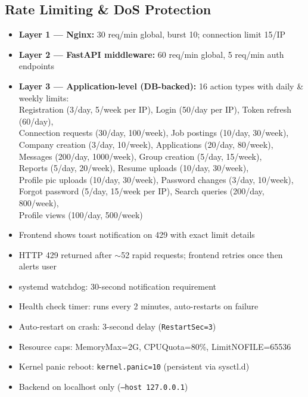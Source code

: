 \documentclass[11pt,a4paper]{article}
\begin{document}
\subsection{Rate Limiting \& DoS Protection}

\begin{tcolorbox}[colback=pass!5, colframe=pass, title=\textbf{Rate Limiting --- PASS}]
\begin{itemize}[nosep]
  \item \textbf{Layer 1 --- Nginx:} 30 req/min global, burst 10; connection limit 15/IP
  \item \textbf{Layer 2 --- FastAPI middleware:} 60 req/min global, 5 req/min auth endpoints
  \item \textbf{Layer 3 --- Application-level (DB-backed):} 16 action types with daily \& weekly limits:\\
    Registration (3/day, 5/week per IP), Login (50/day per IP), Token refresh (60/day),\\
    Connection requests (30/day, 100/week), Job postings (10/day, 30/week),\\
    Company creation (3/day, 10/week), Applications (20/day, 80/week),\\
    Messages (200/day, 1000/week), Group creation (5/day, 15/week),\\
    Reports (5/day, 20/week), Resume uploads (10/day, 30/week),\\
    Profile pic uploads (10/day, 30/week), Password changes (3/day, 10/week),\\
    Forgot password (5/day, 15/week per IP), Search queries (200/day, 800/week),\\
    Profile views (100/day, 500/week)
  \item Frontend shows toast notification on 429 with exact limit details
  \item HTTP 429 returned after $\sim$52 rapid requests; frontend retries once then alerts user
\end{itemize}
\end{tcolorbox}

\begin{tcolorbox}[colback=pass!5, colframe=pass, title=\textbf{Service Resilience --- PASS}]
\begin{itemize}[nosep]
  \item systemd watchdog: 30-second notification requirement
  \item Health check timer: runs every 2 minutes, auto-restarts on failure
  \item Auto-restart on crash: 3-second delay (\texttt{RestartSec=3})
  \item Resource caps: MemoryMax=2G, CPUQuota=80\%, LimitNOFILE=65536
  \item Kernel panic reboot: \texttt{kernel.panic=10} (persistent via sysctl.d)
  \item Backend on localhost only (\texttt{--host 127.0.0.1})
\end{itemize}
\end{tcolorbox}
\end{document}
